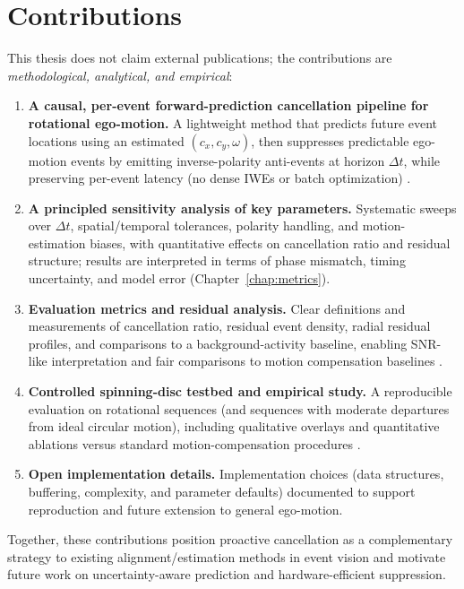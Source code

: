 \section{Contributions}
\label{sec:contributions}

This thesis does not claim external publications; the contributions are \emph{methodological, analytical, and empirical}:

\begin{enumerate}
    \item \textbf{A causal, per-event forward-prediction cancellation pipeline for rotational ego-motion.} A lightweight method that predicts future event locations using an estimated $(c_x,c_y,\omega)$, then suppresses predictable ego-motion events by emitting inverse-polarity anti-events at horizon $\Delta t$, while preserving per-event latency (no dense IWEs or batch optimization) \cite{Bardow2016SOFIE,Gallego2018CMax}.
    \item \textbf{A principled sensitivity analysis of key parameters.} Systematic sweeps over $\Delta t$, spatial/temporal tolerances, polarity handling, and motion-estimation biases, with quantitative effects on cancellation ratio and residual structure; results are interpreted in terms of phase mismatch, timing uncertainty, and model error (Chapter~\ref{chap:metrics}).
    \item \textbf{Evaluation metrics and residual analysis.} Clear definitions and measurements of cancellation ratio, residual event density, radial residual profiles, and comparisons to a background-activity baseline, enabling SNR-like interpretation and fair comparisons to motion compensation baselines \cite{Gallego2020Survey,Bardow2016SOFIE,Gallego2018CMax,Xu2020}.
    \item \textbf{Controlled spinning-disc testbed and empirical study.} A reproducible evaluation on rotational sequences (and sequences with moderate departures from ideal circular motion), including qualitative overlays and quantitative ablations versus standard motion-compensation procedures \cite{Gallego2018CMax,Bardow2016SOFIE,Stoffregen2019Segmentation}.
    \item \textbf{Open implementation details.} Implementation choices (data structures, buffering, complexity, and parameter defaults) documented to support reproduction and future extension to general ego-motion.
\end{enumerate}
Together, these contributions position proactive cancellation as a complementary strategy to existing alignment/estimation methods in event vision \cite{Bardow2016SOFIE,Rebecq2017,Gallego2018CMax} and motivate future work on uncertainty-aware prediction and hardware-efficient suppression.


